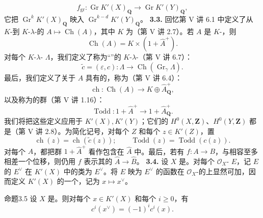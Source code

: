 \[f_{\mathrm{gr}}:\operatorname{Gr}K'(X)_{\mathbf Q}\longrightarrow\operatorname{Gr}K'(Y)_{\mathbf Q},\]
它把 $\operatorname{Gr}^kK'(X)_{\mathbf Q}$ 映入 $\operatorname{Gr}^{k-d}K'(Y)_{\mathbf Q}$。
\textbf{3.3.} 回忆第 V 讲 6.1 中定义了从 $K$-到 $K$-$\lambda$-的 $A\mapsto\operatorname{Ch}(A)$，其中 $K$ 为（第 V 讲 2.7）。若 $A$ 是 $K$-，则
\[\operatorname{Ch}(A)=K\times(1+\widehat A^+).\]
对每个 $K$-$\lambda$- $\Lambda$，我们定义了称为“”的 $K$-$\lambda$-（第 V 讲 6.7）：
\[\widetilde c=(\varepsilon,c):\Lambda\longrightarrow\operatorname{Ch}(\operatorname{Gr}_\gamma\Lambda).\]
最后，我们定义了关于 $A$ 具有的，称为（第 V 讲 6.4）：
\[\operatorname{ch}:\operatorname{Ch}(A)\longrightarrow K\oplus\widehat A^+_{\mathbf Q},\]
以及称为的群（第 V 讲 1.16）：
\[\operatorname{Todd}:1+\widehat A^+\longrightarrow1+\widehat A^+_{\mathbf Q}.\]
我们将把这些定义应用于 $K'(X),K'(Y)$；它们的 $H^0(X,\mathbf Z)$、$H^0(Y,\mathbf Z)$ 都是（第 V 讲 2.8）。为简化记号，对每个 $Z$ 和每个 $z\in K'(Z)$，置
\[\operatorname{ch}(z)=\operatorname{ch}(\widetilde c(z));\qquad\operatorname{Todd}(z)=\operatorname{Todd}(c(z)).\]
对每个 $A$，都把群 $1+\widehat A^+$ 看作包含在 $\widehat A$ 中。最后，若有 $f:A\to B$，与相容至多相差一个位移，则仍用 $f$ 表示其的 $\widehat A\to\widehat B$。
\textbf{3.4.} 设 $X$ 是。对每个 $\mathscr O_X$- $E$，记 $E$ 的 $E^\vee$ 在 $K'(X)$ 中的类为 $E^\vee$。将 $E$ 映为 $E^\vee$ 的函数在 $\mathscr O_X$-的上显然可加，因而定义 $K'(X)$ 的一个，记为 $x\mapsto x^\vee$。
\begin{SGAresult}{命题}{3.5}
设 $X$ 是。则对每个 $x\in K'(X)$ 和每个 $i\geq0$，有
\[c^i(x^\vee)=(-1)^ic^i(x).\]
\end{SGAresult}
